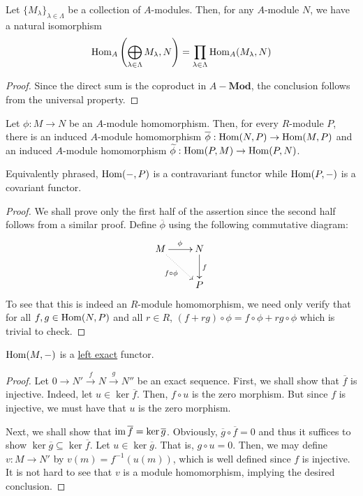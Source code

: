 \begin{proposition}
    Let $\{M_\lambda\}_{\lambda\in\Lambda}$ be a collection of $A$-modules. Then, for any $A$-module $N$, we have a natural isomorphism
    \begin{equation*}
        \operatorname{Hom}_A\left(\bigoplus_{\lambda\in\Lambda}M_\lambda, N\right) = \prod_{\lambda\in\Lambda}\operatorname{Hom}_A(M_\lambda,N)
    \end{equation*}
\end{proposition}
\begin{proof}
    Since the direct sum is the coproduct in $A-\mathbf{Mod}$, the conclusion follows from the universal property.
\end{proof}

\begin{theorem}
    Let $\phi: M\to N$ be an $A$-module homomorphism. Then, for every $R$-module $P$, there is an induced $A$-module homomorphism $\overline\phi:\operatorname{Hom}(N,P)\to\operatorname{Hom}(M,P)$ and an induced $A$-module homomorphism $\widetilde\phi:\operatorname{Hom}(P,M)\to\operatorname{Hom}(P,N)$. 
    
    Equivalently phrased, $\operatorname{Hom}(-,P)$ is a contravariant functor while $\operatorname{Hom}(P,-)$ is a covariant functor.
\end{theorem}
\begin{proof}
    We shall prove only the first half of the assertion since the second half follows from a similar proof. Define $\overline\phi$ using the following commutative diagram: 
    \begin{equation*}
    \xymatrix {
        M\ar[r]^{\phi}\ar@{.>}[rd]_{f\circ\phi} & N\ar[d]^f\\
        & P
    }
    \end{equation*}
    To see that this is indeed an $R$-module homomorphism, we need only verify that for all $f,g\in\operatorname{Hom}(N,P)$ and all $r\in R$, $(f + rg)\circ\phi = f\circ\phi + rg\circ\phi$ which is trivial to check.
\end{proof}

\begin{theorem}
    $\operatorname{Hom}(M,-)$ is a \underline{left exact} functor.
\end{theorem}
\begin{proof}
    Let $0\rightarrow N'\stackrel f\rightarrow N\stackrel g\rightarrow N''$ be an exact sequence. First, we shall show that $\overline f$ is injective. Indeed, let $u\in\ker\overline f$. Then, $f\circ u$ is the zero morphism. But since $f$ is injective, we must have that $u$ is the zero morphism.

    Next, we shall show that $\operatorname{im}\overline f = \ker\overline g$. Obviously, $\overline g\circ\overline f = 0$ and thus it suffices to show $\ker\overline g\subseteq\ker\overline f$. Let $u\in\ker\overline g$. That is, $g\circ u = 0$. Then, we may define $v: M\to N'$ by $v(m) = f^{-1}(u(m))$, which is well defined since $f$ is injective. It is not hard to see that $v$ is a module homomorphism, implying the desired conclusion.
\end{proof}

